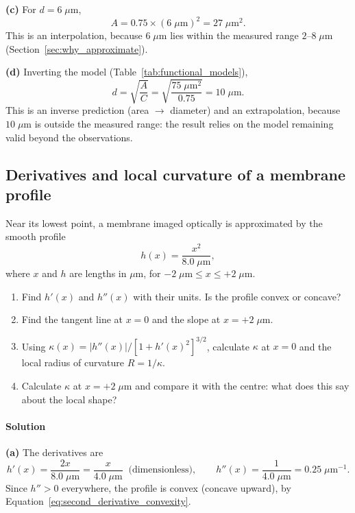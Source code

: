 \textbf{(c)} For $d = 6\;\mu\text{m}$,
\begin{equation*}
A = 0.75 \times (6\;\mu\text{m})^2 = 27\;\mu\text{m}^2.
\end{equation*}
This is an interpolation, because $6\;\mu\text{m}$ lies within the measured range $2$--$8\;\mu\text{m}$ (Section~\ref{sec:why_approximate}).

\textbf{(d)} Inverting the model (Table~\ref{tab:functional_models}),
\begin{equation*}
d = \sqrt{\frac{A}{C}} = \sqrt{\frac{75\;\mu\text{m}^2}{0.75}} = 10\;\mu\text{m}.
\end{equation*}
This is an inverse prediction (area $\to$ diameter) and an extrapolation, because $10\;\mu\text{m}$ is outside the measured range: the result relies on the model remaining valid beyond the observations.

\subsection{Derivatives and local curvature of a membrane profile}
\label{ex:membrane_parabola}

Near its lowest point, a membrane imaged optically is approximated by the smooth profile
\begin{equation*}
h(x) = \frac{x^2}{8.0\;\mu\text{m}},
\end{equation*}
where $x$ and $h$ are lengths in $\mu$m, for $-2\;\mu\text{m} \le x \le +2\;\mu\text{m}$.
\begin{enumerate}[label=(\alph*)]
    \item Find $h'(x)$ and $h''(x)$ with their units. Is the profile convex or concave?
    \item Find the tangent line at $x = 0$ and the slope at $x = +2\;\mu\text{m}$.
    \item Using $\kappa(x) = |h''(x)|/[1 + h'(x)^2]^{3/2}$, calculate $\kappa$ at $x = 0$ and the local radius of curvature $R = 1/\kappa$.
    \item Calculate $\kappa$ at $x = +2\;\mu\text{m}$ and compare it with the centre: what does this say about the local shape?
\end{enumerate}

\paragraph{Solution} \textbf{(a)} The derivatives are
\begin{equation*}
h'(x) = \frac{2x}{8.0\;\mu\text{m}} = \frac{x}{4.0\;\mu\text{m}} \;\;\text{(dimensionless)}, \qquad h''(x) = \frac{1}{4.0\;\mu\text{m}} = 0.25\;\mu\text{m}^{-1}.
\end{equation*}
Since $h'' > 0$ everywhere, the profile is convex (concave upward), by Equation~\eqref{eq:second_derivative_convexity}.

